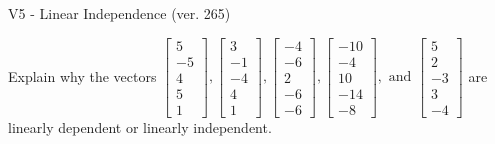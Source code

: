 \begin{exercise}
  \begin{exerciseTitle}V5 - Linear Independence (ver. 265)\end{exerciseTitle}
  \begin{exerciseStatement}
    Explain why the vectors \(\left[\begin{array}{r}
5 \\
-5 \\
4 \\
5 \\
1
\end{array}\right] , \left[\begin{array}{r}
3 \\
-1 \\
-4 \\
4 \\
1
\end{array}\right] , \left[\begin{array}{r}
-4 \\
-6 \\
2 \\
-6 \\
-6
\end{array}\right] , \left[\begin{array}{r}
-10 \\
-4 \\
10 \\
-14 \\
-8
\end{array}\right] , \text{ and } \left[\begin{array}{r}
5 \\
2 \\
-3 \\
3 \\
-4
\end{array}\right]\) are linearly dependent or linearly independent.	



\end{exerciseStatement}
\end{exercise}
